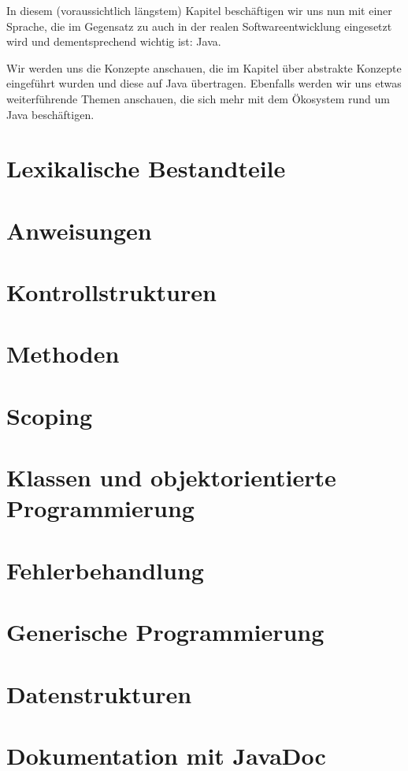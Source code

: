 In diesem (voraussichtlich längstem) Kapitel beschäftigen wir uns nun mit einer Sprache, die im Gegensatz zu \racket auch in der realen Softwareentwicklung eingesetzt wird und dementsprechend wichtig ist: Java.

Wir werden uns die Konzepte anschauen, die im Kapitel über abstrakte Konzepte eingeführt wurden und diese auf Java übertragen. Ebenfalls werden wir uns etwas weiterführende Themen anschauen, die sich mehr mit dem Ökosystem rund um Java beschäftigen. 

\section{Lexikalische Bestandteile}
	

\section{Anweisungen}
	

\section{Kontrollstrukturen}
	

\section{Methoden}
	

\section{Scoping}
	

\section{Klassen und objektorientierte Programmierung}
	

\section{Fehlerbehandlung}
	

\section{Generische Programmierung}
	

\section{Datenstrukturen}
	

\section{Dokumentation mit JavaDoc}
	
